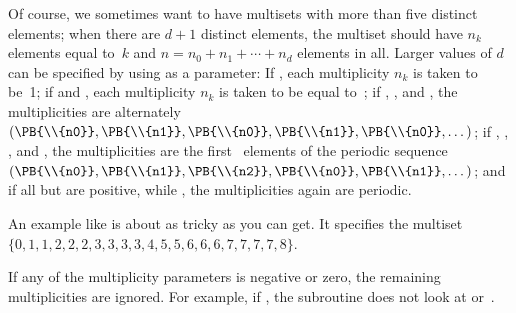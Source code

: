 Of course, we sometimes want to have multisets with more than five distinct
elements; when there are $d+1$ distinct elements, the multiset should have
$n_k$ elements equal to~$k$ and $n=n_0+n_1+\cdots+n_d$ elements in all.
Larger values of $d$ can be specified by using  as a parameter:
If , each multiplicity $n_k$ is taken to be~1; if  and ,
each multiplicity $n_k$ is taken to be equal to~;
if , , and , the
multiplicities are alternately
$(\PB{\\{n0}},\PB{\\{n1}},\PB{\\{n0}},\PB{\\{n1}},\PB{\\{n0}},\ldots\,)$; if  %
, , , and
, the multiplicities are the first~
elements of the
periodic sequence $(\PB{\\{n0}},\PB{\\{n1}},\PB{\\{n2}},\PB{\\{n0}},\PB{%
\\{n1}},\ldots\,)$; and if all
but  are positive, while , the multiplicities
again
are periodic.

An example like  is about as tricky
as you can get. It specifies the multiset $\{0,1,1,2,2,2,3,3,3,3,4,5,5,
6,6,6,7,7,7,7,8\}$.

If any of the multiplicity parameters is negative or zero, the
remaining multiplicities are ignored. For example, if , the
subroutine does not look at  or~.

